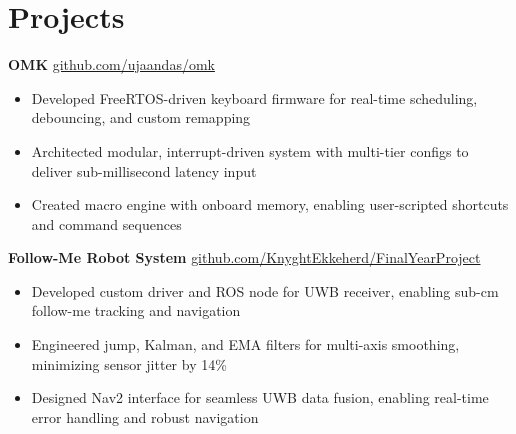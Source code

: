 \documentclass[11pt]{article}       %
\begin{document}
\vspace{-18.5pt}


\section*{Projects}

\textbf{OMK} \hfill \href{https://github.com/ujaandas/omk}{github.com/ujaandas/omk} \\
\vspace{-9pt}
\begin{itemize}
  \item Developed FreeRTOS-driven keyboard firmware for real-time scheduling, debouncing, and custom remapping
  \item Architected modular, interrupt-driven system with multi-tier configs to deliver sub-millisecond latency input
  \item Created macro engine with onboard memory, enabling user-scripted shortcuts and command sequences
\end{itemize}

\textbf{Follow-Me Robot System} \hfill \href{https://github.com/KnyghtEkkeherd/FinalYearProject}{github.com/KnyghtEkkeherd/FinalYearProject} \\
\vspace{-9pt}
\begin{itemize}
  \item Developed custom driver and ROS node for UWB receiver, enabling sub-cm follow-me tracking and navigation
  \item Engineered jump, Kalman, and EMA filters for multi-axis smoothing, minimizing sensor jitter by 14\%
  \item Designed Nav2 interface for seamless UWB data fusion, enabling real-time error handling and robust navigation
\end{itemize}

\end{document}
